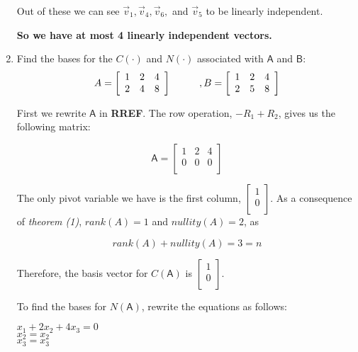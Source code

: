 \documentclass[a4paper, 11pt]{article}
\newcommand{\mat}[1]{\boldsymbol { \mathsf{#1}} }
\begin{document}
\begin{enumerate}
Out of these we can see $\vec v_1, \vec v_4, \vec v_6,$ and $\vec v_5$ to be linearly independent.

\textbf{So we have at most 4 linearly independent vectors.}


\item Find the bases for the $C(\mat \cdot)$ and $N(\mat \cdot)$ associated with $\mat A$ and $\mat B$:
\[ A = \left[ \begin{array}{ccc}
1&2&4\\
2&4&8
\end{array} \right]
\hspace{10mm}, B = \left[ \begin{array}{ccc}
1&2&4\\
2&5&8
\end{array} \right]\]

First we rewrite $\mat{A}$ in \textbf{RREF}. The row operation, $-R_1 + R_2$, gives us the following matrix:

\begin{equation*}
    \mat{A} = 
    \begin{bmatrix}
    1 & 2 & 4 \\
    0 & 0 & 0 \\
    \end{bmatrix}
\end{equation*}

The only pivot variable we have is the first column, $\begin{bmatrix}
1 \\
0 \\
\end{bmatrix}$. As a consequence of \textit{theorem (1)}, $rank(A) = 1$ and $nullity(A) = 2$, as 

\begin{equation*}
    rank(A) + nullity(A) = 3 = n
\end{equation*}

Therefore, the basis vector for $C(\mat{A})$ is $\begin{bmatrix}
1 \\
0 \\
\end{bmatrix}$.

To find the bases for $N(\mat{A})$, rewrite the equations as follows:
\begin{center}
    $x_1 + 2x_2 + 4x_3 = 0$\\
    $x_2 = x_2$ \\
    $x_3 = x_3$ \\
\end{center}


\end{enumerate}
\end{document}
